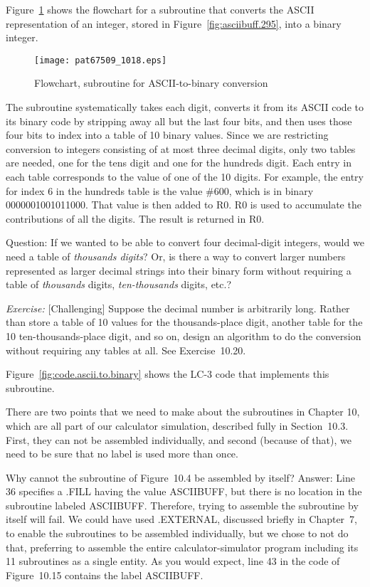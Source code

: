 \documentclass{patt}
\begin{document}
Figure~\ref{fig:flowchart.ascii.to.binary} shows the flowchart for a subroutine
that converts the ASCII representation of an integer, stored in
Figure~\ref{fig:asciibuff.295}, into a binary integer. 

\begin{figure}[h!]
\centerline{\texttt{[image: pat67509\_1018.eps]}}
\caption{Flowchart, subroutine for ASCII-to-binary conversion}
\label{fig:flowchart.ascii.to.binary}
\end{figure}

The subroutine systematically takes each digit, converts it from its
ASCII code to its binary code by stripping away all but the last four
bits, and then uses those four bits to index into a table of 10 binary values. 
Since we are restricting conversion to integers consisting of at most three
decimal digits, only two tables are needed, one for the tens digit and one 
for the hundreds digit.  Each entry in each table corresponds to the value of 
one of the 10 digits.  For example, the entry for index 6 in the hundreds table
is the value \#600, which is in binary 0000001001011000.
That value is then added to R0. R0 is used to accumulate the contributions 
of all the digits. The result is returned in R0.

Question: If we wanted to be able to convert four decimal-digit integers, 
would we need a table of {\em thousands digits}?  Or, is there a way to 
convert larger numbers represented as larger decimal strings into their binary 
form without requiring a table of {\em thousands} digits, {\em ten-thousands} 
digits, etc.? 

{\em Exercise:} [Challenging] Suppose the decimal number is
arbitrarily long. Rather than store a table of 10 values for the
thousands-place digit, another table for the 10 ten-thousands-place
digit, and so on, design an algorithm to do the conversion without
requiring any tables at all. See Exercise~10.20.

\FloatBarrier
Figure~\ref{fig:code.ascii.to.binary} shows the LC-3 code that
implements this subroutine.

There are two points that we need to make about the subroutines in 
Chapter 10, which are all part of our calculator simulation, described
fully in Section~10.3.  First, they can not be assembled individually, 
and second (because of that), we need to be sure that no label is used more 
than once.  

Why cannot the subroutine of Figure~10.4 be assembled by itself?  Answer:
Line 36 specifies a .FILL having the value ASCIIBUFF, but there is no location
in the subroutine labeled ASCIIBUFF.  Therefore, trying to assemble
the subroutine by itself will fail.  We could have used .EXTERNAL, discussed 
briefly in Chapter~7, to enable the subroutines to be assembled individually, 
but we chose to not do that, preferring to assemble the entire 
calculator-simulator program including its 11 subroutines as a single entity.  
As you would expect, line 43 in the code of Figure~10.15 contains the label
ASCIIBUFF.
\end{document}
